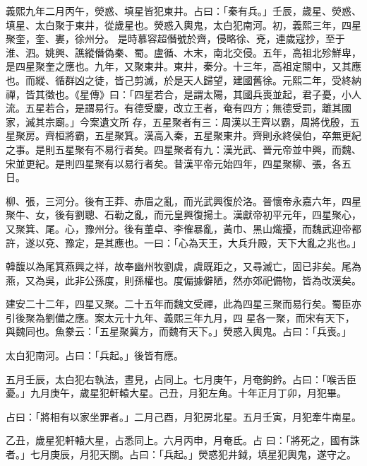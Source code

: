 \begin{pinyinscope}
 義熙九年二月丙午，熒惑、填星皆犯東井。占曰：「秦有兵。」壬辰，歲星、熒惑、填星、太白聚于東井，從歲星也。熒惑入輿鬼，太白犯南河。初，義熙三年，四星聚奎，奎、婁，徐州分。
 是時慕容超僭號於齊，侵略徐、兗，連歲寇抄，至于淮、泗。姚興、譙縱僭偽秦、蜀。盧循、木末，南北交侵。五年，高祖北殄鮮卑，是四星聚奎之應也。九年，又聚東井。東井，秦分。十三年，高祖定關中，又其應也。而縱、循群凶之徒，皆己剪滅，於是天人歸望，建國舊徐。元熙二年，受終納禪，皆其徵也。《星傳》曰：「四星若合，是謂太陽，其國兵喪並起，君子憂，小人流。五星若合，是謂易行。有德受慶，改立王者，奄有四方；無德受罰，離其國家，滅其宗廟。」今案遺文所
 存，五星聚者有三：周漢以王齊以霸，周將伐殷，五星聚房。齊桓將霸，五星聚箕。漢高入秦，五星聚東井。齊則永終侯伯，卒無更紀之事。是則五星聚有不易行者矣。四星聚者有九：漢光武、晉元帝並中興，而魏、宋並更紀。是則四星聚有以易行者矣。昔漢平帝元始四年，四星聚柳、張，各五日。



 柳、張，三河分。後有王莽、赤眉之亂，而光武興復於洛。晉懷帝永嘉六年，四星聚牛、女，後有劉聰、石勒之亂，而元皇興復揚土。漢獻帝初平元年，四星聚心，
 又聚箕、尾。心，豫州分。後有董卓、李傕暴亂，黃巾、黑山熾擾，而魏武迎帝都許，遂以兗、豫定，是其應也。一曰：「心為天王，大兵升殿，天下大亂之兆也。」



 韓馥以為尾箕燕興之祥，故奉幽州牧劉虞，虞既距之，又尋滅亡，固已非矣。尾為燕，又為吳，此非公孫度，則孫權也。度偏據僻陋，然亦郊祀備物，皆為改漢矣。



 建安二十二年，四星又聚。二十五年而魏文受禪，此為四星三聚而易行矣。蜀臣亦引後聚為劉備之應。案太元十九年、義熙三年九月，四
 星各一聚，而宋有天下，與魏同也。魚豢云：「五星聚冀方，而魏有天下。」熒惑入輿鬼。占曰：「兵喪。」



 太白犯南河。占曰：「兵起。」後皆有應。



 五月壬辰，太白犯右執法，晝見，占同上。七月庚午，月奄鉤鈐。占曰：「喉舌臣憂。」九月庚午，歲星犯軒轅大星。己丑，月犯左角。十年正月丁卯，月犯畢。



 占曰：「將相有以家坐罪者。」二月己酉，月犯房北星。五月壬寅，月犯牽牛南星。



 乙丑，歲星犯軒轅大星，占悉同上。六月丙申，月奄氐。占
 曰：「將死之，國有誅者。」七月庚辰，月犯天關。占曰：「兵起。」熒惑犯井鉞，填星犯輿鬼，遂守之。




\end{pinyinscope}
